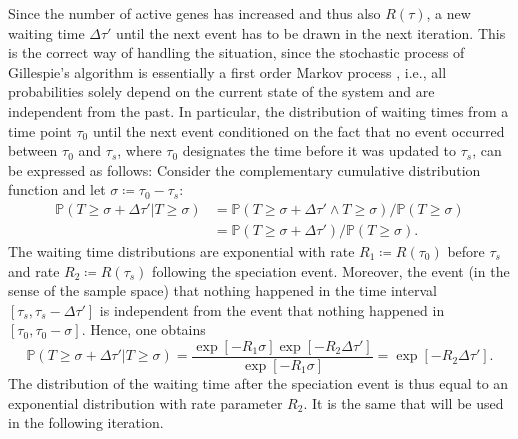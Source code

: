 \documentclass[hidelinks,11pt]{scrreprt}
\begin{document}
Since the number of active genes has increased and thus also $R(\tau)$, a new waiting time $\Delta\tau'$ until the next event has to be drawn in the next iteration.
This is the correct way of handling the situation, since the stochastic process of Gillespie's algorithm is essentially a first order Markov process \citep{bustin2006}, i.e., all probabilities solely depend on the current state of the system and are independent from the past.
In particular, the distribution of waiting times from a time point $\tau_0$ until the next event conditioned on the fact that no event occurred between $\tau_0$ and $\tau_s$, where $\tau_0$ designates the time before it was updated to $\tau_s$, can be expressed as follows: Consider the complementary cumulative distribution function and let $\sigma \coloneqq \tau_0-\tau_s$: 
\begin{equation}
\begin{aligned}
\mathbb{P}(T \ge \sigma+\Delta\tau' |  T \ge \sigma) & =
\mathbb{P}(T \ge \sigma+\Delta\tau' \wedge T \ge \sigma)/\mathbb{P}(T\ge \sigma) \\
& = \mathbb{P}(T \ge \sigma + \Delta\tau')/\mathbb{P}(T \ge \sigma).
\end{aligned}
\end{equation}
The waiting time distributions are exponential with rate $R_1 \coloneqq R(\tau_0)$ before $\tau_s$ and rate $R_2 \coloneqq R(\tau_s)$ following the speciation event. Moreover, the event (in the sense of the sample space) that nothing happened in the time interval $[\tau_s, \tau_s-\Delta\tau']$ is independent from the event that nothing happened in $[\tau_0, \tau_0-\sigma]$. 
Hence, one obtains
\begin{equation}
\mathbb{P}(T \ge \sigma+\Delta\tau' |  T \ge \sigma) = \frac{\exp{\left[-R_1 \sigma \right]}\exp{\left[-R_2 \Delta\tau'\right]}}{ \exp{\left[-R_1 \sigma\right]}} =
\exp{\left[-R_2\Delta\tau'\right]}  .
\end{equation}
The distribution of the waiting time after the speciation event is thus equal to an exponential distribution with rate parameter $R_2$. It is the same that will be used in the following iteration.
\end{document}
